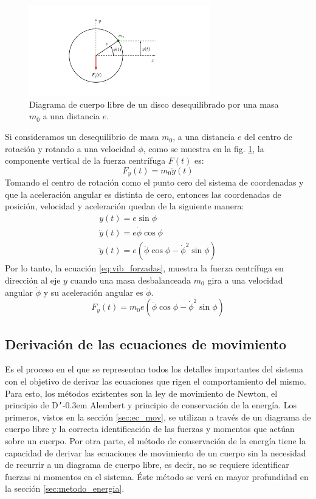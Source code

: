 \begin{figure}[h]
\centering
\includegraphics[width=0.7\textwidth, trim={6cm 2cm 10cm 3cm}, clip]{Imagenes/dcl_maqdes.pdf}
\caption{Diagrama de cuerpo libre de un disco desequilibrado por una masa $m_0$ a una distancia $e$.}
\label{fig:dcl_maqdes}
\end{figure}

Si consideramos un desequilibrio de masa $m_0$, a una distancia $e$ del centro de rotación y rotando a una velocidad $\phi$, como se muestra en la fig. \ref{fig:dcl_maqdes}, la componente vertical de la fuerza centrífuga $F(t)$ es:
\begin{equation}
	F_y(t) = m_0\ddot{y}(t)
\end{equation}
Tomando el centro de rotación como el punto cero del sistema de coordenadas y que la aceleración angular es distinta de cero, entonces las coordenadas de posición, velocidad y aceleración quedan de la siguiente manera:
\begin{gather*}
	y(t) = e \sin \phi\\
	\dot{y}(t) = e \dot{\phi}\cos \phi\\
	\ddot{y}(t) = e(\ddot{\phi}\cos\phi - \dot{\phi}^2\sin\phi)
\end{gather*}
Por lo tanto, la ecuación \ref{eq:vib_forzadas}, muestra la fuerza centrífuga en dirección al eje $y$ cuando una masa desbalanceada $m_0$ gira a una velocidad angular $\dot{\phi}$ y su aceleración angular es $\ddot{\phi}$.
\begin{equation}\label{eq:vib_forzadas}
	F_y(t) = m_0e(\ddot{\phi}\cos\phi- \dot{\phi}^2\sin\phi)
\end{equation}

\subsection{Derivación de las ecuaciones de movimiento}
Es el proceso en el que se representan todos los detalles importantes del sistema con el objetivo de derivar las ecuaciones que  rigen el comportamiento del mismo. Para esto, los métodos existentes son la ley de movimiento de Newton, el principio de D\texttt{'}\kern-0.3em Alembert y principio de conservación de la energía. Los primeros, vistos en la sección \ref{sec:ec_mov}, se utilizan a través de un diagrama de cuerpo libre y la correcta identificación de las fuerzas y momentos que actúan sobre un cuerpo. Por otra parte, el método de conservación de la energía tiene la capacidad de derivar las ecuaciones de movimiento de un cuerpo sin la necesidad de recurrir a un diagrama de cuerpo libre, es decir, no se requiere identificar fuerzas ni momentos en el sistema. Éste método se verá en mayor profundidad en la sección \ref{sec:metodo_energia}.


